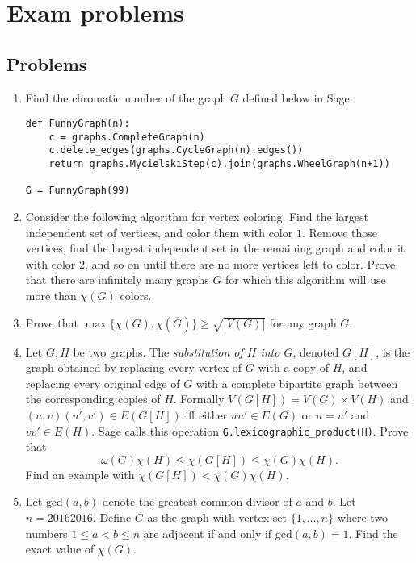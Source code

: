 \chapter{Exam problems}

\section{Problems}

\begin{enumerate}

\item Find the chromatic number of the graph $G$ defined below in Sage:
\begin{verbatim}
def FunnyGraph(n):
    c = graphs.CompleteGraph(n)
    c.delete_edges(graphs.CycleGraph(n).edges())
    return graphs.MycielskiStep(c).join(graphs.WheelGraph(n+1))

G = FunnyGraph(99)
\end{verbatim}


\item Consider the following algorithm for vertex coloring. Find the largest independent set of vertices, and color them with color $1$. Remove those vertices, find the largest independent set in the remaining graph and color it with color $2$, and so on until there are no more vertices left to color. Prove that there are infinitely many graphs $G$ for which this algorithm will use more than $\chi(G)$ colors.


\item Prove that $\max\{\chi(G),\chi(\overline{G})\}\geq \sqrt{|V(G)|}$ for any graph $G$.


\item Let $G, H$ be two graphs. The \emph{substitution of $H$ into $G$}, denoted $G[H]$, is the graph obtained by replacing every vertex of $G$ with a copy of $H$, and replacing every original edge of $G$ with a complete bipartite graph between the corresponding copies of $H$. Formally $V(G[H])=V(G)\times V(H)$ and $(u,v)(u',v')\in E(G[H])$ iff either $uu'\in E(G)$ or $u=u'$ and $vv'\in E(H)$. Sage calls this operation \texttt{G.lexicographic\_product(H)}. Prove that
$$\omega(G)\chi(H)\leq \chi(G[H])\leq \chi(G)\chi(H).$$
Find an example with $\chi(G[H])<\chi(G)\chi(H)$.


\item Let $\textrm{gcd}(a,b)$ denote the greatest common divisor of $a$ and $b$. Let $n=20162016$. Define $G$ as the graph with vertex set $\{1,\ldots,n\}$ where two numbers $1\leq a<b\leq n$ are adjacent if and only if $\textrm{gcd}(a,b)=1$. Find the exact value of $\chi(G)$.



\end{enumerate}
